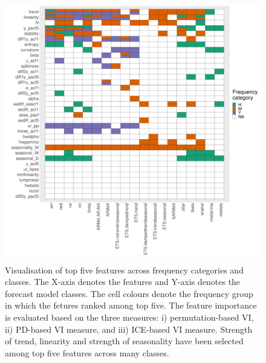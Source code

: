 \documentclass[11pt,a4paper,]{article}
\begin{document}
\begin{figure}[h]

{\centering \includegraphics[width=\textwidth]{figure/viplot-1} 

}

\caption{Visualisation  of top five features across frequency categories and classes. The X-axis denotes the features and Y-axis denotes the forecast model classes. The cell colours denote the frequency group in which the fetures ranked among top five. The feature importance is evaluated based on the three measures: i) permutation-based VI, ii) PD-based VI measure, and iii) ICE-based VI measure. Strength of trend, linearity and strength of seasonality have been selected among top five features across many classes.}\label{fig:viplot}
\end{figure}
\end{document}
